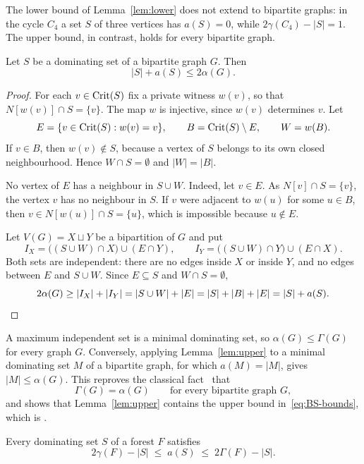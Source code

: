 The lower bound of Lemma~\ref{lem:lower} does not extend to bipartite
graphs: in the cycle $C_4$ a set $S$ of three vertices has $a(S)=0$, while
$2\gamma(C_4)-|S|=1$. The upper bound, in contrast, holds for every bipartite
graph.

\begin{lemma}\label{lem:upper}
Let $S$ be a dominating set of a bipartite graph $G$. Then
\[
  |S|+a(S)\le 2\alpha(G).
\]
\end{lemma}

\begin{proof}
For each $v\in\operatorname{Crit}(S)$ fix a private witness $w(v)$, so that
$N[w(v)]\cap S=\{v\}$. The map $w$ is injective, since $w(v)$ determines $v$.
Let
\[
  E=\{v\in\operatorname{Crit}(S): w(v)=v\},\qquad B=\operatorname{Crit}(S)\setminus E,\qquad W=w(B).
\]
If $v\in B$, then $w(v)\notin S$, because a vertex of $S$ belongs to its own
closed neighbourhood. Hence $W\cap S=\emptyset$ and $|W|=|B|$.

No vertex of $E$ has a neighbour in $S\cup W$. Indeed, let $v\in E$. As
$N[v]\cap S=\{v\}$, the vertex $v$ has no neighbour in $S$. If $v$ were
adjacent to $w(u)$ for some $u\in B$, then $v\in N[w(u)]\cap S=\{u\}$, which
is impossible because $u\notin E$.

Let $V(G)=X\sqcup Y$ be a bipartition of $G$ and put
\[
  I_X=\bigl((S\cup W)\cap X\bigr)\cup(E\cap Y),\qquad
  I_Y=\bigl((S\cup W)\cap Y\bigr)\cup(E\cap X).
\]
Both sets are independent: there are no edges inside $X$ or inside $Y$, and
no edges between $E$ and $S\cup W$. Since $E\subseteq S$ and $W\cap
S=\emptyset$,
\[
  2\alpha(G)\ge|I_X|+|I_Y|=|S\cup W|+|E|=|S|+|B|+|E|=|S|+a(S). \qedhere
\]
\end{proof}

A maximum independent set is a minimal dominating set, so
$\alpha(G)\le\Gamma(G)$ for every graph $G$. Conversely, applying
Lemma~\ref{lem:upper} to a minimal dominating set $M$ of a bipartite graph,
for which $a(M)=|M|$, gives $|M|\le\alpha(G)$. This reproves the classical
fact~\cite{CFPT} that
\begin{equation}\label{eq:alpha-Gamma}
  \Gamma(G)=\alpha(G)\qquad\text{for every bipartite graph } G,
\end{equation}
and shows that Lemma~\ref{lem:upper} contains the upper bound
in~\eqref{eq:BS-bounds}, which is \cite[Lemma~15]{BS}.

\begin{corollary}\label{cor:twosided}
Every dominating set $S$ of a forest $F$ satisfies
\begin{equation}\label{eq:twosided}
  2\gamma(F)-|S|\;\le\;a(S)\;\le\;2\Gamma(F)-|S| .
\end{equation}
\end{corollary}

